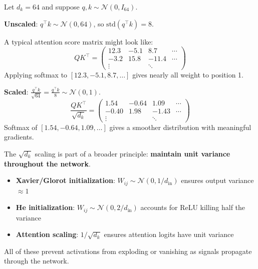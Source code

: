 \begin{remark}
    Let $d_k = 64$ and suppose $q, k \sim \mathcal{N}(0, I_{64})$.

    \textbf{Unscaled}: $q^\top k \sim \mathcal{N}(0, 64)$, so $\text{std}(q^\top k) = 8$.

    A typical attention score matrix might look like:
    \[
        QK^\top = \begin{pmatrix} 12.3 & -5.1 & 8.7 & \cdots \\ -3.2 & 15.8 & -11.4 & \cdots \\ \vdots & & \ddots \end{pmatrix}
    \]
    Applying softmax to $[12.3, -5.1, 8.7, \ldots]$ gives nearly all weight to position 1.

    \textbf{Scaled}: $\frac{q^\top k}{\sqrt{64}} = \frac{q^\top k}{8} \sim \mathcal{N}(0, 1)$.
    \[
        \frac{QK^\top}{\sqrt{d_k}} = \begin{pmatrix} 1.54 & -0.64 & 1.09 & \cdots \\ -0.40 & 1.98 & -1.43 & \cdots \\ \vdots & & \ddots \end{pmatrix}
    \]
    Softmax of $[1.54, -0.64, 1.09, \ldots]$ gives a smoother distribution with meaningful gradients.
\end{remark}

\begin{remark}
    The $\sqrt{d_k}$ scaling is part of a broader principle: \textbf{maintain unit variance throughout the network}.

    \begin{itemize}
        \item \textbf{Xavier/Glorot initialization}: $W_{ij} \sim \mathcal{N}(0, 1/d_{\text{in}})$ ensures output variance $\approx 1$
        \item \textbf{He initialization}: $W_{ij} \sim \mathcal{N}(0, 2/d_{\text{in}})$ accounts for ReLU killing half the variance
        \item \textbf{Attention scaling}: $1/\sqrt{d_k}$ ensures attention logits have unit variance
    \end{itemize}

    All of these prevent activations from exploding or vanishing as signals propagate through the network.
\end{remark}

